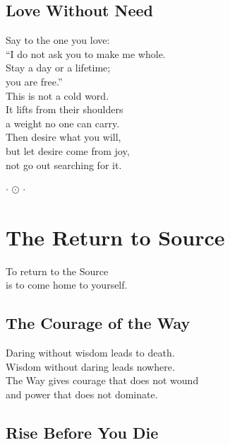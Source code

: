 \documentclass[10pt, openright]{book}
\newcommand{\sectionbreak}{\filbreak}
\newcommand{\sayingsource}[1]{\par\nopagebreak\vspace{0.3\baselineskip}{\raggedleft\footnotesize\itshape #1\par}}
\newcommand{\ornament}{
    \vspace{1.5cm}
    \begin{center}
        \large \(\cdot\) \(\odot\) \(\cdot\)
    \end{center}
    \vspace{1.5cm}
}
\begin{document}
\sayingsource{Tao Te Ching 72 · Philip}

\sectionbreak

\section{Love Without Need}\label{love-without-need}

Say to the one you love:\\
``I do not ask you to make me whole.\\
Stay a day or a lifetime;\\
you are free.''\\
This is not a cold word.\\
It lifts from their shoulders\\
a weight no one can carry.\\
Then desire what you will,\\
but let desire come from joy,\\
not go out searching for it.

\sayingsource{Philip · William Blake}

\ornament

\chapter{The Return to Source}\label{the-return-to-source}

\begin{center}
To return to the Source\\
is to come home to yourself.
\end{center}

\sectionbreak

\section{The Courage of the Way}\label{the-courage-of-the-way}

Daring without wisdom leads to death.\\
Wisdom without daring leads nowhere.\\
The Way gives courage that does not wound\\
and power that does not dominate.

\sayingsource{Tao Te Ching 73}

\sectionbreak

\section{Rise Before You Die}\label{rise-before-you-die}
\end{document}
